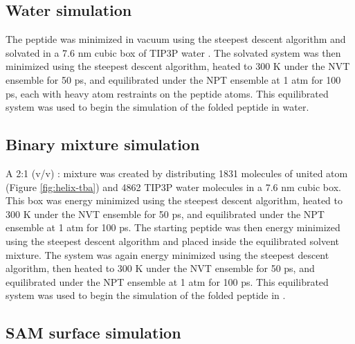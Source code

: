 \subsection{Water simulation}

The peptide was minimized in vacuum using the steepest descent algorithm and solvated in a 7.6 nm cubic box of TIP3P water \cite{Jorgensen1983}. 
The solvated system was then minimized using the steepest descent algorithm, heated to 300 K under the NVT ensemble for 50 ps, and equilibrated under the NPT ensemble at 1 atm for 100 ps, each with heavy atom restraints on the peptide atoms. 
This equilibrated system was used to begin the simulation of the folded peptide in water. 

\subsection{Binary mixture simulation}

A 2:1 (v/v) \tba{}: mixture was created by distributing 1831 molecules of united atom \tba{} (Figure \ref{fig:helix-tba}) and 4862 TIP3P water molecules in a 7.6 nm cubic box. 
This box was energy minimized using the steepest descent algorithm, heated to 300 K under the NVT ensemble for 50 ps, and equilibrated under the NPT ensemble at 1 atm for 100 ps. 
The starting peptide was then energy minimized using the steepest descent algorithm and placed inside the equilibrated solvent mixture. 
The system was again energy minimized using the steepest descent algorithm, then heated to 300 K under the NVT ensemble for 50 ps, and equilibrated under the NPT ensemble at 1 atm for 100 ps. 
This equilibrated system was used to begin the simulation of the folded peptide in \tbawat{}. 

\subsection{SAM surface simulation}

